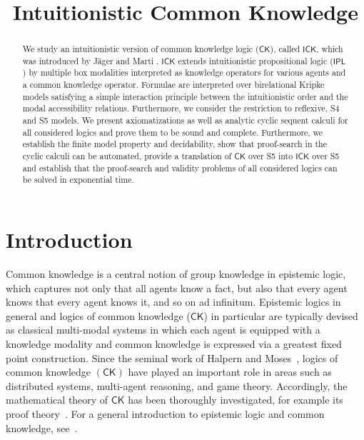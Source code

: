 \documentclass{myifcolog}
\title{Intuitionistic Common Knowledge}
\date{}
\newcommand{\ICK}{\mathsf{ICK}}
\numberwithin{theorem}{section}
\begin{document}
\maketitle

\begin{abstract}
\noindent We study an intuitionistic version of common knowledge logic ($\mathsf{CK}$), called $\ICK$, which was introduced by Jäger and Marti \cite{jager-intuitionistic_2016}. $\ICK$ extends intuitionistic propositional logic ($\mathsf{IPL}$) by multiple box modalities interpreted as knowledge operators for various agents and a common knowledge operator. Formulae are interpreted over birelational Kripke models satisfying a simple interaction principle between the intuitionistic order and the modal accessibility relations. Furthermore, we consider the restriction to reflexive, S4 and S5 models. We present axiomatizations as well as analytic cyclic sequent calculi for all considered logics and prove them to be sound and complete. Furthermore, we establish the finite model property and decidability, show that proof-search in the cyclic calculi can be automated, provide a translation of $\mathsf{CK}$ over S5 into $\ICK$ over S5 and establish that the proof-search and validity problems of all considered logics can be solved in exponential time.
\end{abstract}


\section{Introduction}\label{s: introduction}

Common knowledge is a central notion of group knowledge in epistemic logic, which captures not only that all agents know a fact, but also that every agent knows that every agent knows it, and so on ad infinitum. Epistemic logics in general and logics of common knowledge ($\mathsf{CK}$) in particular are typically devised as classical multi-modal systems in which each agent is equipped with a knowledge modality and common knowledge is expressed via a greatest fixed point construction. Since the seminal work of Halpern and Moses~\cite{Halpern_1990}, logics of common knowledge $(\mathsf{CK})$ have played an important role in areas such as distributed systems, multi-agent reasoning, and game theory. Accordingly, the mathematical theory of $\mathsf{CK}$ has been thoroughly investigated, for example its proof theory~\cite{alberucci_2005, studer_2009, Marti_2018, rooduijn_analytic_2022}. For a general introduction to epistemic logic and common knowledge, see~\cite{ditmarsch_2017}. 
\end{document}
